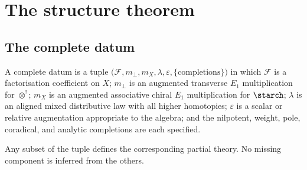 \chapter{The structure theorem}
\label{ch:structure}

\section{The complete datum}

\begin{definition}
\label{def:complete-datum}
A complete datum is a tuple $\bigl(\mathcal F, m_\perp, m_X, \lambda,
\varepsilon, \{\text{completions}\}\bigr)$ in which $\mathcal F$ is a
factorisation coefficient on $X$; $m_\perp$ is an augmented transverse
$E_1$ multiplication for $\otimes^!$; $m_X$ is an augmented associative
chiral $E_1$ multiplication for $\starch$; $\lambda$ is an aligned mixed
distributive law with all higher homotopies; $\varepsilon$ is a scalar or
relative augmentation appropriate to the algebra; and the nilpotent,
weight, pole, coradical, and analytic completions are each specified.
\end{definition}

Any subset of the tuple defines the corresponding partial theory. No
missing component is inferred from the others.

